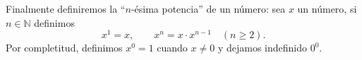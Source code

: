 \documentclass[handout]{beamer} %
\begin{document}
 

\medspace 
 

 \medspace 




 Finalmente definiremos  la ``$n$-ésima potencia'' de un número: sea $x$ un  número, si $n \in \mathbb N $ definimos\pause 
 $$
 x^1=x,\qquad x^n= x \cdot x^{n-1} \quad (n\ge 2).
 $$\pause 
 Por completitud,  definimos $x^0=1$ cuando $x \ne 0$ y  dejamos indefinido $0^0$. 
\end{document}
